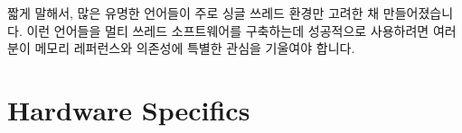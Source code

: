 짧게 말해서, 많은 유명한 언어들이 주로 싱글 쓰레드 환경만 고려한 채
만들어졌습니다.
이런 언어들을 멀티 쓰레드 소프트웨어를 구축하는데 성공적으로 사용하려면
여러분이 메모리 레퍼런스와 의존성에 특별한 관심을 기울여야 합니다.

\section{Hardware Specifics}
\label{sec:memorder:Hardware Specifics}

